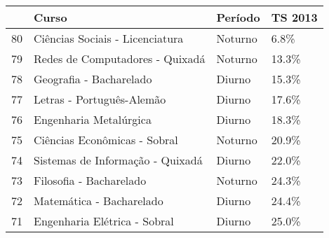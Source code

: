 \begin{tabular}{llll}
\toprule
{} &                             Curso &  Período & TS 2013 \\
\midrule
80 &   Ciências Sociais - Licenciatura &  Noturno &    6.8\% \\
79 &   Redes de Computadores - Quixadá &  Noturno &   13.3\% \\
78 &           Geografia - Bacharelado &   Diurno &   15.3\% \\
77 &         Letras - Português-Alemão &   Diurno &   17.6\% \\
76 &            Engenharia Metalúrgica &   Diurno &   18.3\% \\
75 &      Ciências Econômicas - Sobral &  Noturno &   20.9\% \\
74 &  Sistemas de Informação - Quixadá &   Diurno &   22.0\% \\
73 &           Filosofia - Bacharelado &  Noturno &   24.3\% \\
72 &          Matemática - Bacharelado &   Diurno &   24.4\% \\
71 &      Engenharia Elétrica - Sobral &   Diurno &   25.0\% \\
\bottomrule
\end{tabular}
